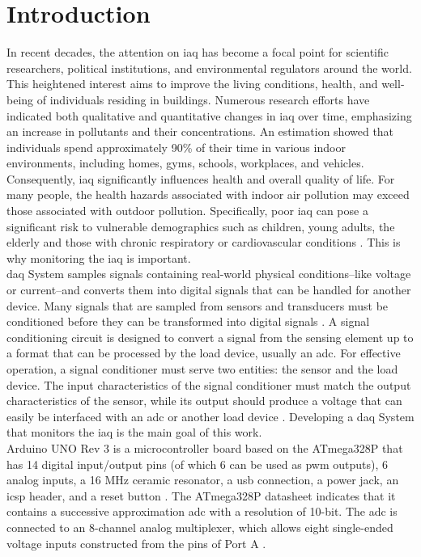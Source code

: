 \section{Introduction}
\label{sec:introduction}
\hspace{8pt}
In recent decades, the attention on \acrfull{iaq} has become a focal point for scientific researchers, political institutions, and environmental regulators around the world. This heightened interest aims to improve the living conditions, health, and well-being of individuals residing in buildings. Numerous research efforts have indicated both qualitative and quantitative changes in \acrshort{iaq} over time, emphasizing an increase in pollutants and their concentrations. An estimation showed that individuals spend approximately 90\% of their time in various indoor environments, including homes, gyms, schools, workplaces, and vehicles. Consequently, \acrshort{iaq} significantly influences health and overall quality of life. For many people, the health hazards associated with indoor air pollution may exceed those associated with outdoor pollution. Specifically, poor \acrshort{iaq} can pose a significant risk to vulnerable demographics such as children, young adults, the elderly and those with chronic respiratory or cardiovascular conditions \cite{cincinelli_2017}. This is why monitoring the \acrshort{iaq} is important. \\

\acrfull{daq} System samples signals containing real-world physical conditions--like voltage or current--and converts them into digital signals that can be handled for another device. Many signals that are sampled from sensors and transducers must be conditioned before they can be transformed into digital signals \cite{di_paolo_2013}. A signal conditioning circuit is designed to convert a signal from the sensing element up to a format that can be processed by the load device, usually an \acrfull{adc}. For effective operation, a signal conditioner must serve two entities: the sensor and the load device. The input characteristics of the signal conditioner must match the output characteristics of the sensor, while its output should produce a voltage that can easily be interfaced with an \acrshort{adc} or another load device \cite{fraden_2016}. Developing a \acrshort{daq} System that monitors the \acrshort{iaq} is the main goal of this work. \\

Arduino UNO Rev 3 is a microcontroller board based on the ATmega328P that has 14 digital input/output pins (of which 6 can be used as \acrfull{pwm} outputs), 6 analog inputs, a 16 MHz ceramic resonator, a \acrfull{usb} connection, a power jack, an \acrfull{icsp} header, and a reset button \cite{arduino_2024}. The ATmega328P datasheet \cite{atmega328p} indicates that it contains a successive approximation \acrshort{adc} with a resolution of 10-bit. The \acrshort{adc} is connected to an 8-channel analog multiplexer, which allows eight single-ended voltage inputs constructed from the pins of Port A \cite{atmega328p}.
